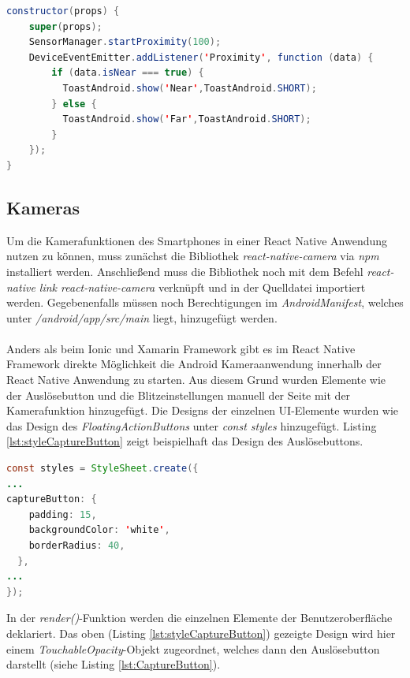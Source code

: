 \begin{lstlisting}[caption=Auslesen und Anzeigen der Daten des Näherungssensors, label=lst:ProximityData, language=Java]
constructor(props) {
    super(props);
    SensorManager.startProximity(100);
    DeviceEventEmitter.addListener('Proximity', function (data) {
        if (data.isNear === true) {
          ToastAndroid.show('Near',ToastAndroid.SHORT);
        } else {
          ToastAndroid.show('Far',ToastAndroid.SHORT);
        }
    });
}
\end{lstlisting}

\subsection*{Kameras}

Um die Kamerafunktionen des Smartphones in einer React Native Anwendung nutzen zu können, muss zunächst die Bibliothek \textit{react-native-camera} via \textit{npm} installiert werden. Anschließend muss die Bibliothek noch mit dem Befehl \textit{react-native link react-native-camera} verknüpft und in der Quelldatei importiert werden. Gegebenenfalls müssen noch Berechtigungen im \textit{AndroidManifest}, welches unter \textit{/android/app/src/main} liegt, hinzugefügt werden. 
\\
\\
Anders als beim Ionic und Xamarin Framework gibt es im React Native Framework direkte Möglichkeit die Android Kameraanwendung innerhalb der React Native Anwendung zu starten. Aus diesem Grund wurden Elemente wie der Auslösebutton und die Blitzeinstellungen manuell der Seite mit der Kamerafunktion hinzugefügt. Die Designs der einzelnen UI-Elemente wurden wie das Design des \textit{FloatingActionButtons} unter \textit{const styles} hinzugefügt. Listing \ref{lst:styleCaptureButton} zeigt beispielhaft das Design des Auslösebuttons.

\begin{lstlisting}[caption=Das Design des Auslösebuttons für die Kamerafunktion, label=lst:styleCaptureButton, language=Java]
const styles = StyleSheet.create({
...
captureButton: {
    padding: 15,
    backgroundColor: 'white',
    borderRadius: 40,
  },
...
});
\end{lstlisting} 

In der \textit{render()}-Funktion werden die einzelnen Elemente der Benutzeroberfläche deklariert. Das oben (Listing \ref{lst:styleCaptureButton}) gezeigte Design wird hier einem \textit{TouchableOpacity}-Objekt zugeordnet, welches dann den Auslösebutton darstellt (siehe Listing \ref{lst:CaptureButton}). 

